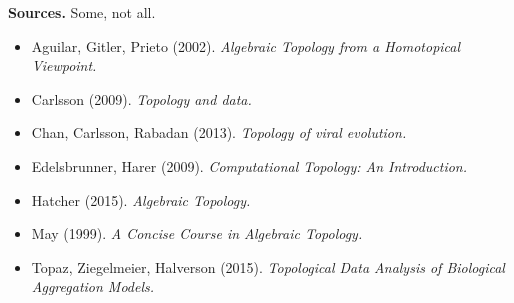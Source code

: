 \documentclass[10pt]{article}
\begin{document}
\noindent
\textbf{Sources.} Some, not all.
\begin{itemize}
\item Aguilar, Gitler, Prieto (2002). \textit{Algebraic Topology from a Homotopical Viewpoint.}
\item Carlsson (2009). \textit{Topology and data.}
\item Chan, Carlsson, Rabadan (2013). \textit{Topology of viral evolution.}
\item Edelsbrunner, Harer (2009). \textit{Computational Topology: An Introduction.}
\item Hatcher (2015). \textit{Algebraic Topology.}
\item May (1999). \textit{A Concise Course in Algebraic Topology.}
\item Topaz, Ziegelmeier, Halverson (2015). \textit{Topological Data Analysis of Biological Aggregation Models.}
\end{itemize}

\noindent
\end{document}
